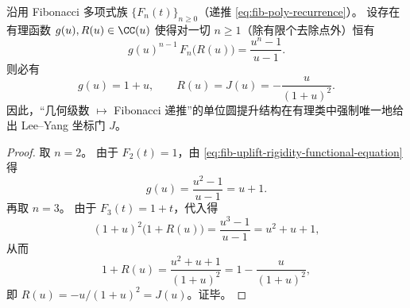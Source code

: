 \begin{theorem}\label{thm:fib-uplift-coordinate-gate-rigidity}
沿用 Fibonacci 多项式族 \(\{F_n(t)\}_{n\ge 0}\)（递推 \eqref{eq:fib-poly-recurrence}）。
设存在有理函数 \(g(u),R(u)\in\CC(u)\) 使得对一切 \(n\ge 1\)（除有限个去除点外）恒有
\begin{equation}\label{eq:fib-uplift-rigidity-functional-equation}
g(u)^{n-1}\,F_n\!\bigl(R(u)\bigr)=\frac{u^n-1}{u-1}.
\end{equation}
则必有
\[
g(u)=1+u,\qquad R(u)=J(u)=-\frac{u}{(1+u)^2}.
\]
因此，“几何级数 \(\mapsto\) Fibonacci 递推”的单位圆提升结构在有理类中强制唯一地给出 Lee--Yang 坐标门 \(J\)。
\end{theorem}
\begin{proof}
取 \(n=2\)。
由于 \(F_2(t)=1\)，由 \eqref{eq:fib-uplift-rigidity-functional-equation} 得
\[
g(u)=\frac{u^2-1}{u-1}=u+1.
\]
再取 \(n=3\)。
由于 \(F_3(t)=1+t\)，代入得
\[
(1+u)^2\bigl(1+R(u)\bigr)=\frac{u^3-1}{u-1}=u^2+u+1,
\]
从而
\[
1+R(u)=\frac{u^2+u+1}{(1+u)^2}=1-\frac{u}{(1+u)^2},
\]
即 \(R(u)=-u/(1+u)^2=J(u)\)。证毕。
\end{proof}

